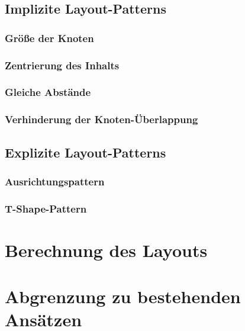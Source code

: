 \subsection{Implizite Layout-Patterns}
\label{subsec:implicit-layout-patterns}

\subsubsection{Größe der Knoten}
\subsubsection{Zentrierung des Inhalts}
\subsubsection{Gleiche Abstände}
\subsubsection{Verhinderung der Knoten-Überlappung}

\subsection{Explizite Layout-Patterns}
\label{subsec:explicit-layout-patterns}

\subsubsection{Ausrichtungspattern}
\subsubsection{T-Shape-Pattern}


\section{Berechnung des Layouts}
\label{sec:layout-calculation}


\section{Abgrenzung zu bestehenden Ansätzen}
\label{sec:current-approaches-comparison}

